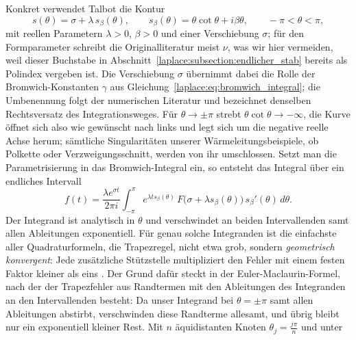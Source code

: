 

Konkret verwendet Talbot die Kontur
\begin{equation}
    s(\theta)
    =
    \sigma + \lambda \, s_{\beta}(\theta),
    \qquad
    s_{\beta}(\theta)
    =
    \theta \cot \theta + i \beta \theta,
    \qquad
    -\pi < \theta < \pi,
    \label{laplace:eq:talbot_kontur}
\end{equation}
mit reellen Parametern $\lambda > 0$, $\beta > 0$ und einer Verschiebung
$\sigma$; für den Formparameter schreibt die Originalliteratur meist
$\nu$, was wir hier vermeiden, weil dieser Buchstabe in
Abschnitt~\ref{laplace:subsection:endlicher_stab} bereits als Polindex
vergeben ist.
Die Verschiebung $\sigma$ übernimmt dabei die Rolle der
Bromwich-Konstanten $\gamma$ aus
Gleichung~\eqref{laplace:eq:bromwich_integral}; die Umbenennung folgt der
numerischen Literatur und bezeichnet denselben Rechtsversatz des
Integrationsweges.
Für $\theta \to \pm\pi$ strebt $\theta \cot\theta \to -\infty$, die Kurve
öffnet sich also wie gewünscht nach links und legt sich um die negative
reelle Achse herum; sämtliche Singularitäten unserer
Wärmeleitungsbeispiele, ob Polkette oder Verzweigungsschnitt, werden von
ihr umschlossen.
Setzt man die Parametrisierung in das Bromwich-Integral ein, so entsteht
das Integral über ein endliches Intervall
\begin{equation}
    f(t)
    =
    \frac{\lambda e^{\sigma t}}{2\pi i}
    \int_{-\pi}^{\pi}
    e^{\lambda t s_{\beta}(\theta)}
    \,
    F\bigl(\sigma + \lambda s_{\beta}(\theta)\bigr)
    \,
    s_{\beta}'(\theta)
    \, d\theta.
    \label{laplace:eq:talbot_integral}
\end{equation}
Der Integrand ist analytisch in $\theta$ und verschwindet an beiden
Intervallenden samt allen Ableitungen exponentiell.
Für genau solche Integranden ist die einfachste aller Quadraturformeln,
die Trapezregel, nicht etwa grob, sondern \emph{geometrisch konvergent}:
%
Jede zusätzliche Stützstelle multipliziert den Fehler mit einem festen
Faktor kleiner als eins \cite{laplace:trefethen2006}.
Der Grund dafür steckt in der Euler-Maclaurin-Formel, nach der der
%
Trapezfehler aus Randtermen mit den Ableitungen des Integranden an den
Intervallenden besteht:
Da unser Integrand bei $\theta = \pm\pi$ samt allen Ableitungen
abstirbt, verschwinden diese Randterme allesamt, und übrig bleibt nur
ein exponentiell kleiner Rest.
Mit $n$ äquidistanten Knoten $\theta_j = \frac{j\pi}{n}$ und unter
